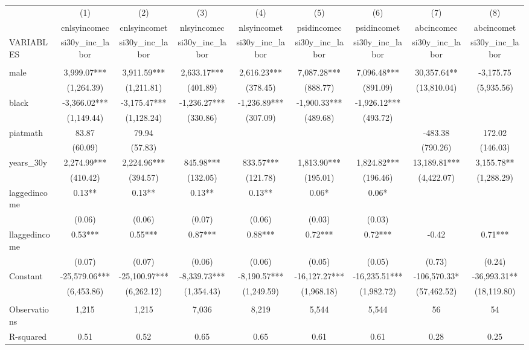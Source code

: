 \begin{tabular}{lcccccccc} \hline
 & (1) & (2) & (3) & (4) & (5) & (6) & (7) & (8) \\
 & cnlsyincomec & cnlsyincomet & nlsyincomec & nlsyincomet & psidincomec & psidincomet & abcincomec & abcincomet \\
VARIABLES & si30y\_inc\_labor & si30y\_inc\_labor & si30y\_inc\_labor & si30y\_inc\_labor & si30y\_inc\_labor & si30y\_inc\_labor & si30y\_inc\_labor & si30y\_inc\_labor \\ \hline
 &  &  &  &  &  &  &  &  \\
male & 3,999.07*** & 3,911.59*** & 2,633.17*** & 2,616.23*** & 7,087.28*** & 7,096.48*** & 30,357.64** & -3,175.75 \\
 & (1,264.39) & (1,211.81) & (401.89) & (378.45) & (888.77) & (891.09) & (13,810.04) & (5,935.56) \\
black & -3,366.02*** & -3,175.47*** & -1,236.27*** & -1,236.89*** & -1,900.33*** & -1,926.12*** &  &  \\
 & (1,149.44) & (1,128.24) & (330.86) & (307.09) & (489.68) & (493.72) &  &  \\
piatmath & 83.87 & 79.94 &  &  &  &  & -483.38 & 172.02 \\
 & (60.09) & (57.83) &  &  &  &  & (790.26) & (146.03) \\
years\_30y & 2,274.99*** & 2,224.96*** & 845.98*** & 833.57*** & 1,813.90*** & 1,824.82*** & 13,189.81*** & 3,155.78** \\
 & (410.42) & (394.57) & (132.05) & (121.78) & (195.01) & (196.46) & (4,422.07) & (1,288.29) \\
laggedincome & 0.13** & 0.13** & 0.13** & 0.13** & 0.06* & 0.06* &  &  \\
 & (0.06) & (0.06) & (0.07) & (0.06) & (0.03) & (0.03) &  &  \\
llaggedincome & 0.53*** & 0.55*** & 0.87*** & 0.88*** & 0.72*** & 0.72*** & -0.42 & 0.71*** \\
 & (0.07) & (0.07) & (0.06) & (0.06) & (0.05) & (0.05) & (0.73) & (0.24) \\
Constant & -25,579.06*** & -25,100.97*** & -8,339.73*** & -8,190.57*** & -16,127.27*** & -16,235.51*** & -106,570.33* & -36,993.31** \\
 & (6,453.86) & (6,262.12) & (1,354.43) & (1,249.59) & (1,968.18) & (1,982.72) & (57,462.52) & (18,119.80) \\
 &  &  &  &  &  &  &  &  \\
Observations & 1,215 & 1,215 & 7,036 & 8,219 & 5,544 & 5,544 & 56 & 54 \\
 R-squared & 0.51 & 0.52 & 0.65 & 0.65 & 0.61 & 0.61 & 0.28 & 0.25 \\ \hline
\end{tabular}
